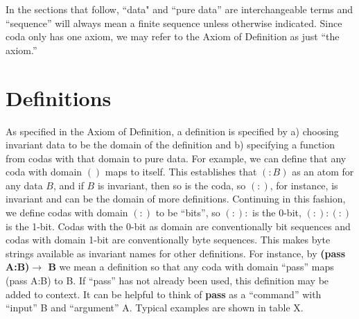 \documentclass[11pt]{article}
\begin{document}
In the sections that follow, 
``data" and ``pure data'' are interchangeable terms and ``sequence'' will always mean a finite sequence unless otherwise indicated.  Since coda 
only has one axiom, we may refer to the Axiom of Definition as just ``the axiom.'' 

\section{Definitions} 

      As specified in the Axiom of Definition, a definition is specified by a) choosing invariant data to be the domain of the definition and b) specifying a function from 
 codas with that domain to pure data.  For example, we can define that any coda with domain $()$ maps to itself.  This establishes that $(:B)$ as an atom for any 
 data $B$, and if $B$ is invariant, then so is the coda, so $(:)$, for instance, is invariant and can be the domain of more definitions. Continuing in this fashion, we define 
 codas with domain $(:)$ to be ``bits'', so $(:):$ is the 0-bit, $(:):(:)$ is the 1-bit.  Codas with the 0-bit as domain are conventionally bit sequences and codas with 
 domain 1-bit are conventionally byte sequences.  This makes byte strings available as invariant names for other definitions.  For instance, by 
 {\bf (pass A:B)$\rightarrow$ B} we mean a definition so that any coda with domain ``pass'' maps (pass A:B) to B.  If ``pass'' has not already been used, this 
 definition may be added to context.  It can be helpful to think of {\bf pass} as a ``command'' with ``input'' B and ``argument'' A.  
Typical examples are shown in table X.  
\end{document}
